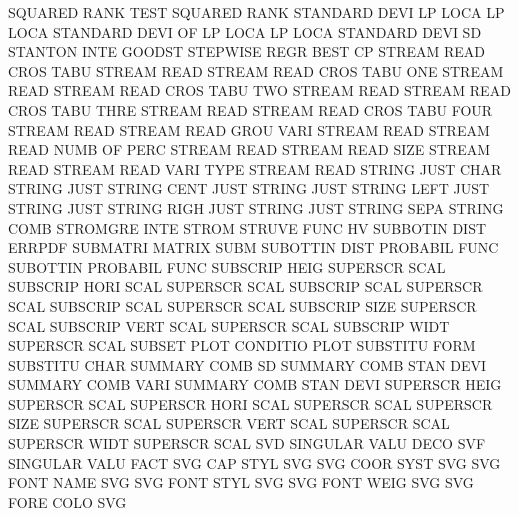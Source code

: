 SQUARED  RANK TEST                      SQUARED  RANK
STANDARD DEVI LP   LOCA                 LP       LOCA
STANDARD DEVI OF   LP   LOCA            LP       LOCA
STANDARD DEVI                           SD
STANTON  INTE                           GOODST
STEPWISE REGR                           BEST     CP
STREAM   READ CROS TABU                 STREAM   READ
STREAM   READ CROS TABU ONE             STREAM   READ
STREAM   READ CROS TABU TWO             STREAM   READ
STREAM   READ CROS TABU THRE            STREAM   READ
STREAM   READ CROS TABU FOUR            STREAM   READ
STREAM   READ GROU VARI                 STREAM   READ
STREAM   READ NUMB OF   PERC            STREAM   READ
STREAM   READ SIZE                      STREAM   READ
STREAM   READ VARI TYPE                 STREAM   READ
STRING   JUST CHAR                      STRING   JUST
STRING   CENT JUST                      STRING   JUST
STRING   LEFT JUST                      STRING   JUST
STRING   RIGH JUST                      STRING   JUST
STRING   SEPA                           STRING   COMB
STROMGRE INTE                           STROM
STRUVE   FUNC                           HV
SUBBOTIN DIST                           ERRPDF
SUBMATRI                                MATRIX   SUBM
SUBOTTIN DIST                           PROBABIL FUNC
SUBOTTIN                                PROBABIL FUNC
SUBSCRIP HEIG                           SUPERSCR SCAL
SUBSCRIP HORI SCAL                      SUPERSCR SCAL
SUBSCRIP SCAL                           SUPERSCR SCAL
SUBSCRIP SCAL                           SUPERSCR SCAL
SUBSCRIP SIZE                           SUPERSCR SCAL
SUBSCRIP VERT SCAL                      SUPERSCR SCAL
SUBSCRIP WIDT                           SUPERSCR SCAL
SUBSET   PLOT                           CONDITIO PLOT
SUBSTITU FORM                           SUBSTITU CHAR
SUMMARY  COMB SD                        SUMMARY  COMB STAN DEVI
SUMMARY  COMB VARI                      SUMMARY  COMB STAN DEVI
SUPERSCR HEIG                           SUPERSCR SCAL
SUPERSCR HORI SCAL                      SUPERSCR SCAL
SUPERSCR SIZE                           SUPERSCR SCAL
SUPERSCR VERT SCAL                      SUPERSCR SCAL
SUPERSCR WIDT                           SUPERSCR SCAL
SVD                                     SINGULAR VALU DECO
SVF                                     SINGULAR VALU FACT
SVG      CAP  STYL                      SVG
SVG      COOR SYST                      SVG
SVG      FONT NAME                      SVG
SVG      FONT STYL                      SVG
SVG      FONT WEIG                      SVG
SVG      FORE COLO                      SVG
